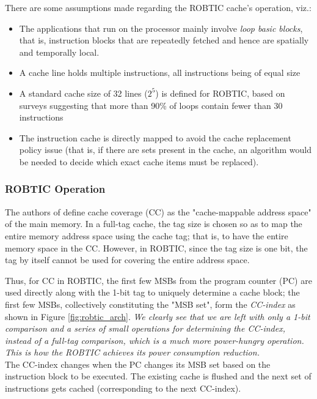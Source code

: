 \documentclass[conference]{IEEEtran}
\begin{document}
There are some assumptions made regarding the ROBTIC cache's operation, viz.:
\begin{itemize}
	\item The applications that run on the processor mainly involve \textit{loop basic blocks}, that is, instruction blocks that are repeatedly fetched and hence are spatially and temporally local. 
	\item A cache line holds multiple instructions, all instructions being of equal size 
	\item A standard cache size of 32 lines ($2^5$) is defined for ROBTIC, based on surveys suggesting that more than 90\% of loops contain fewer than 30 instructions \cite{survey1} \cite{survey2}
	\item The instruction cache is directly mapped to avoid the cache replacement policy issue (that is, if there are sets present in the cache, an algorithm would be needed to decide which exact cache items must be replaced).
\end{itemize}

\subsubsection{ROBTIC Operation}

The authors of \cite{robtic} define cache coverage (CC) as the "cache-mappable address space" of the main memory. In a full-tag cache, the tag size is chosen so as to map the entire memory address space using the cache tag; that is, to have the entire memory space in the CC. However, in ROBTIC, since the tag size is one bit, the tag by itself cannot be used for covering the entire address space. 

Thus, for CC in ROBTIC, the first few MSBs from the program counter (PC) are used directly along with the 1-bit tag to uniquely determine a cache block; the first few MSBs, collectively constituting the "MSB set", form the \textit{CC-index} as shown in Figure \ref{fig:robtic_arch}. 
\textit{We clearly see that we are left with only a 1-bit comparison and a series of small operations for determining the CC-index, instead of a full-tag comparison, which is a much more power-hungry operation. This is how the ROBTIC achieves its power consumption reduction.}
\\
The CC-index changes when the PC changes its MSB set based on the instruction block to be executed. The existing cache is flushed and the next set of instructions gets cached (corresponding to the next CC-index).
\end{document}
